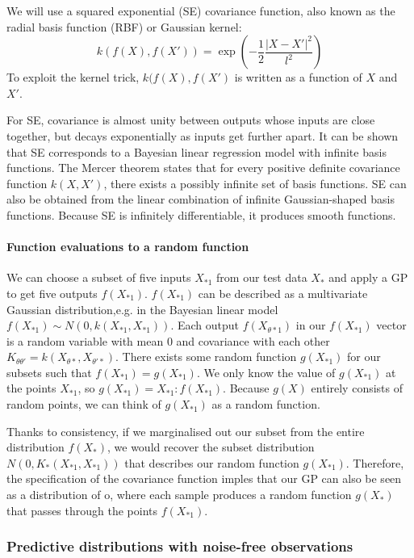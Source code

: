 \documentclass[10pt]{article}
\begin{document}
We will use a squared exponential (SE) covariance function, also known as the radial basis function (RBF) or Gaussian kernel:
\begin{equation*}
    k(f(X), f(X')) = \exp\left(-\frac{1}{2}\frac{|X - X'|^2}{l^2}\right)
\end{equation*}
To exploit the kernel trick, $k(f(X), f(X')$ is written as a function of $X$ and $X'$. 

For SE, covariance is almost unity between outputs whose inputs are close together, but decays exponentially as inputs get further apart.  It can be shown that SE corresponds to a Bayesian linear regression model with infinite basis functions. The Mercer theorem states that for every positive definite covariance function $k(X,X')$, there exists a possibly infinite set of basis functions. SE can also be obtained from the linear combination of infinite Gaussian-shaped basis functions. Because SE is infinitely differentiable, it produces smooth functions.


\paragraph{Function evaluations to a random function}
We can choose a subset of five inputs $X_{*1}$ from our test data $X_*$ and apply a GP to get five outputs $f(X_{*1})$. $f(X_{*1})$ can be described as a multivariate Gaussian distribution,e.g. in the Bayesian linear model $f(X_{*1}) \sim N(0, k(X_{*1}, X_{*1}))$. Each output $f(X_{\theta*1})$ in our $f(X_{*1})$ vector is a random variable with mean $0$ and covariance with each other $K_{\theta\theta'} = k(X_{\theta*}, X_{\theta'*})$. There exists some random function $g(X_{*1})$ for our subsets such that $f(X_{*1}) = g(X_{*1})$. We only know the value of $g(X_{*1})$ at the points $X_{*1}$, so $g(X_{*1}) = {X_{*1} : f(X_{*1})}$. Because $g(X)$ entirely consists of random points, we can think of $g(X_{*1})$ as a random function.
    
Thanks to consistency, if we marginalised out our subset from the entire distribution $f(X_*)$, we would recover the subset distribution $N(0, K_*(X_{*1}, X_{*1}))$ that describes our random function $g(X_{*1})$. Therefore, the specification of the covariance function imples that our GP can also be seen as a distribution of o, where each sample produces a random function $g(X_*)$ that passes through the points $f(X_{*1})$.


\subsubsection{Predictive distributions with noise-free observations}
\end{document}

